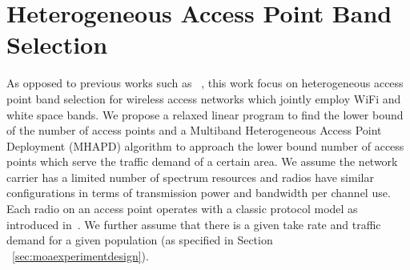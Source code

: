 



\section{Heterogeneous Access Point Band Selection}
\label{subsec:moaproblem}

As opposed to previous works such as ~\cite{franklin2007node,robinson2010deploying,si2010overview}, 
this work focus on heterogeneous access point band selection for wireless access networks which jointly employ WiFi 
and white space bands. We propose a relaxed linear program to find the lower bound of the number of access points
and a Multiband Heterogeneous Access Point Deployment (MHAPD) algorithm  to approach the lower bound 
number of access points which serve the traffic demand of a certain area. We assume the network carrier has a limited number 
of spectrum resources and radios have similar configurations in terms of transmission power and bandwidth per channel use. 
Each radio on an access point operates with a classic protocol model as introduced in~\cite{gupta2000capacity}. 
We further assume that there is a given take rate and traffic demand for a given population (as specified in Section
~\ref{sec:moaexperimentdesign}).


